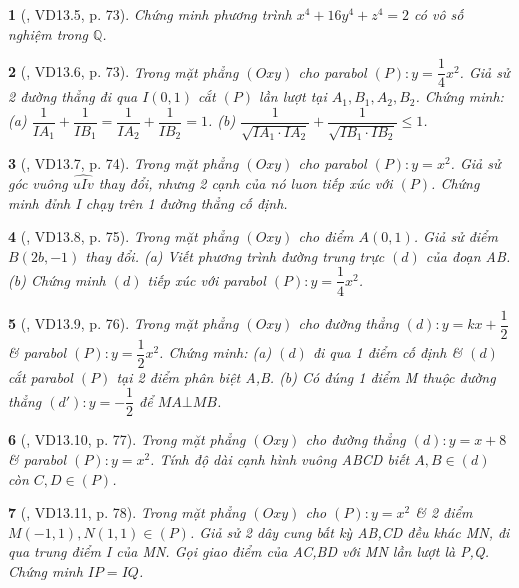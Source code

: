 \documentclass{article}
\newtheorem{baitoan}{}
\begin{document}
\begin{baitoan}[\cite{TLCT_THCS_Toan_9_dai_so}, VD13.5, p. 73]
	Chứng minh phương trình $x^4 + 16y^4 + z^4 = 2$ có vô số nghiệm trong $\mathbb{Q}$.
\end{baitoan}

\begin{baitoan}[\cite{TLCT_THCS_Toan_9_dai_so}, VD13.6, p. 73]
	Trong mặt phẳng $(Oxy)$ cho parabol $(P):y = \dfrac{1}{4}x^2$. Giả sử 2 đường thẳng đi qua $I(0,1)$ cắt $(P)$ lần lượt tại $A_1,B_1,A_2,B_2$. Chứng minh: (a) $\dfrac{1}{IA_1} + \dfrac{1}{IB_1} = \dfrac{1}{IA_2} + \dfrac{1}{IB_2} = 1$. (b) $\dfrac{1}{\sqrt{IA_1\cdot IA_2}} + \dfrac{1}{\sqrt{IB_1\cdot IB_2}}\le1$.
\end{baitoan}

\begin{baitoan}[\cite{TLCT_THCS_Toan_9_dai_so}, VD13.7, p. 74]
	Trong mặt phẳng $(Oxy)$ cho parabol $(P):y = x^2$. Giả sử góc vuông $\widehat{uIv}$ thay đổi, nhưng 2 cạnh của nó luon tiếp xúc với $(P)$. Chứng minh đỉnh I chạy trên 1 đường thẳng cố định.
\end{baitoan}

\begin{baitoan}[\cite{TLCT_THCS_Toan_9_dai_so}, VD13.8, p. 75]
	Trong mặt phẳng $(Oxy)$ cho điểm $A(0,1)$. Giả sử điểm $B(2b,-1)$ thay đổi. (a) Viết phương trình đường trung trực $(d)$ của đoạn AB. (b) Chứng minh $(d)$ tiếp xúc với parabol $(P):y = \dfrac{1}{4}x^2$.
\end{baitoan}

\begin{baitoan}[\cite{TLCT_THCS_Toan_9_dai_so}, VD13.9, p. 76]
	Trong mặt phẳng $(Oxy)$ cho đường thẳng $(d):y = kx + \dfrac{1}{2}$ \& parabol $(P):y = \dfrac{1}{2}x^2$. Chứng minh: (a) $(d)$ đi qua 1 điểm cố định \& $(d)$ cắt parabol $(P)$ tại 2 điểm phân biệt A,B. (b) Có đúng 1 điểm M thuộc đường thẳng $(d'):y = -\dfrac{1}{2}$ để $MA\bot MB$.
\end{baitoan}

\begin{baitoan}[\cite{TLCT_THCS_Toan_9_dai_so}, VD13.10, p. 77]
	Trong mặt phẳng $(Oxy)$ cho đường thẳng $(d):y = x + 8$ \& parabol $(P):y = x^2$. Tính độ dài cạnh hình vuông ABCD biết $A,B\in(d)$ còn $C,D\in(P)$.
\end{baitoan}

\begin{baitoan}[\cite{TLCT_THCS_Toan_9_dai_so}, VD13.11, p. 78]
	Trong mặt phẳng $(Oxy)$ cho $(P):y = x^2$ \& 2 điểm $M(-1,1),N(1,1)\in(P)$. Giả sử 2 dây cung bất kỳ AB,CD đều khác MN, đi qua trung điểm I của MN. Gọi giao điểm của AC,BD với MN lần lượt là P,Q. Chứng minh $IP = IQ$. 
\end{baitoan}
\end{document}
